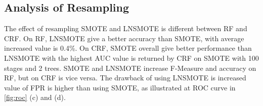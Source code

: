 \subsection{Analysis of Resampling}

The effect of resampling SMOTE and LNSMOTE is different between RF and CRF.
On RF, LNSMOTE give a better accuracy than SMOTE, with average increased value
is 0.4\%.
On CRF, SMOTE overall give better performance than LNSMOTE with the highest AUC
value is returned by CRF on SMOTE with 100 stages and 2 trees.
SMOTE and LNSMOTE increase F-Measure and accuracy on RF, but on CRF is vice
versa.
The drawback of using LNSMOTE is increased value of FPR is higher than using
SMOTE, as illustrated at ROC curve in \figurename \ref{fig:roc} (c) and (d).
